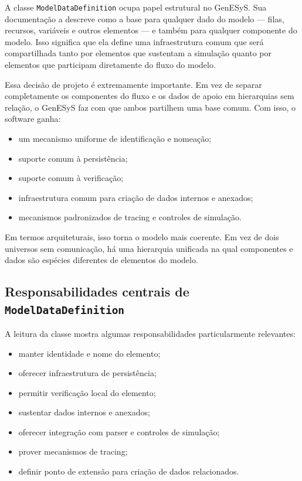 A classe \texttt{ModelDataDefinition} ocupa papel estrutural no GenESyS. Sua documentação a descreve como a base para qualquer dado do modelo — filas, recursos, variáveis e outros elementos — e também para qualquer componente do modelo. Isso significa que ela define uma infraestrutura comum que será compartilhada tanto por elementos que sustentam a simulação quanto por elementos que participam diretamente do fluxo do modelo.

Essa decisão de projeto é extremamente importante. Em vez de separar completamente os componentes do fluxo e os dados de apoio em hierarquias sem relação, o GenESyS faz com que ambos partilhem uma base comum. Com isso, o software ganha:
\begin{itemize}
    \item um mecanismo uniforme de identificação e nomeação;
    \item suporte comum à persistência;
    \item suporte comum à verificação;
    \item infraestrutura comum para criação de dados internos e anexados;
    \item mecanismos padronizados de tracing e controles de simulação.
\end{itemize}

Em termos arquiteturais, isso torna o modelo mais coerente. Em vez de dois universos sem comunicação, há uma hierarquia unificada na qual componentes e dados são espécies diferentes de elementos do modelo.

\subsection{Responsabilidades centrais de \texttt{ModelDataDefinition}}
\label{subsec:cap8_responsabilidades_modeldatadefinition}

A leitura da classe mostra algumas responsabilidades particularmente relevantes:
\begin{itemize}
    \item manter identidade e nome do elemento;
    \item oferecer infraestrutura de persistência;
    \item permitir verificação local do elemento;
    \item sustentar dados internos e anexados;
    \item oferecer integração com parser e controles de simulação;
    \item prover mecanismos de tracing;
    \item definir ponto de extensão para criação de dados relacionados.
\end{itemize}

